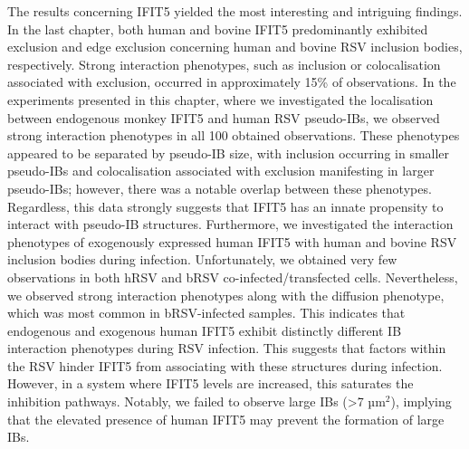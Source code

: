 The results concerning IFIT5 yielded the most interesting and intriguing findings. In the last chapter, both human and bovine IFIT5 predominantly exhibited exclusion and edge exclusion concerning human and bovine RSV inclusion bodies, respectively. Strong interaction phenotypes, such as inclusion or colocalisation associated with exclusion, occurred in approximately 15\% of observations. In the experiments presented in this chapter, where we investigated the localisation between endogenous monkey IFIT5 and human RSV pseudo-IBs, we observed strong interaction phenotypes in all 100 obtained observations. These phenotypes appeared to be separated by pseudo-IB size, with inclusion occurring in smaller pseudo-IBs and colocalisation associated with exclusion manifesting in larger pseudo-IBs; however, there was a notable overlap between these phenotypes. Regardless, this data strongly suggests that IFIT5 has an innate propensity to interact with pseudo-IB structures. Furthermore, we investigated the interaction phenotypes of exogenously expressed human IFIT5 with human and bovine RSV inclusion bodies during infection. Unfortunately, we obtained very few observations in both hRSV and bRSV co-infected/transfected cells. Nevertheless, we observed strong interaction phenotypes along with the diffusion phenotype, which was most common in bRSV-infected samples. This indicates that endogenous and exogenous human IFIT5 exhibit distinctly different IB interaction phenotypes during RSV infection. This suggests that factors within the RSV hinder IFIT5 from associating with these structures during infection. However, in a system where IFIT5 levels are increased, this saturates the inhibition pathways. Notably, we failed to observe large IBs (>7 \(\mbox{µm}^2\)), implying that the elevated presence of human IFIT5 may prevent the formation of large IBs.


